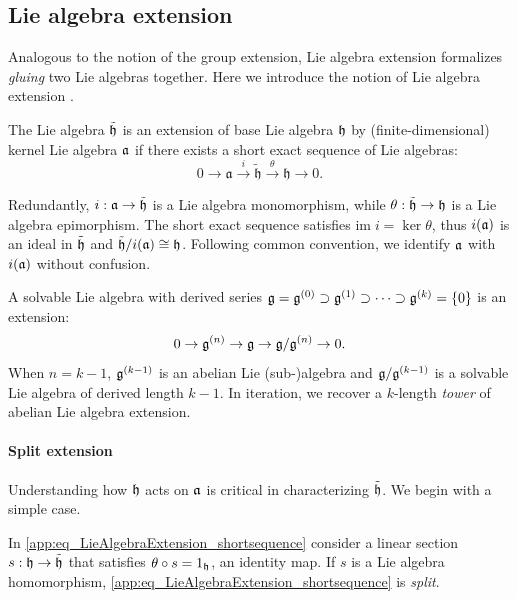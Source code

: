 \subsection{Lie algebra extension}
\label{app:subsubsec_extensionprelim}
Analogous to the notion of the group extension, Lie algebra extension formalizes \emph{gluing} two Lie algebras together.
Here we introduce the notion of Lie algebra extension \cite{weibel1994introduction,rotman2009introduction, PhysicsExtension, beckett2022symplectic}.
\begin{definition}
    \label{app:def_LieAlgebraExtension}
    The Lie algebra $\tilde{\mathfrak{h}}$ is an extension of base Lie algebra $\mathfrak{h}$ by (finite-dimensional) kernel Lie algebra $\mathfrak{a}$ if there exists a short exact sequence of Lie algebras:
    \begin{equation}
    \label{app:eq_LieAlgebraExtension_shortsequence}
        0 \to \mathfrak{a} \xrightarrow{i} \tilde{\mathfrak{h}} \xrightarrow{\theta} \mathfrak{h} \to 0.
    \end{equation}
\end{definition}
Redundantly, $i: \mathfrak{a} \to \tilde{\mathfrak{h}}$ is a Lie algebra monomorphism,
while $\theta: \tilde{\mathfrak{h}} \to \mathfrak{h}$ is a Lie algebra epimorphism.
The short exact sequence satisfies $\text{im}\; i = \ker \theta$,
thus $i(\mathfrak{a})$ is an ideal in $\tilde{\mathfrak{h}}$ and $\tilde{\mathfrak{h}}/i(\mathfrak{a}) \cong \mathfrak{h}$.
Following common convention, we identify $\mathfrak{a}$ with $i(\mathfrak{a})$ without confusion.
\begin{remark}
\label{app:rem_solvable_k_tower}
A solvable Lie algebra with derived series $\mathfrak{g} = \mathfrak{g}^{(0)} \supset \mathfrak{g}^{(1)} \supset \cdots \supset \mathfrak{g}^{(k)}=\{0\}$
is an extension:
\begin{equation*}
    0 \to \mathfrak{g}^{(n)} \to \mathfrak{g} \to \mathfrak{g} / \mathfrak{g}^{(n)} \to 0.
\end{equation*}
When $n = k-1$, $\mathfrak{g}^{(k-1)}$ is an abelian Lie (sub-)algebra and
$\mathfrak{g} / \mathfrak{g}^{(k-1)}$ is a solvable Lie algebra of derived length $k-1$.
In iteration, we recover a $k$-length \emph{tower} of abelian Lie algebra extension.
\paragraph{Split extension}
Understanding how $\mathfrak{h}$ acts on $\mathfrak{a}$ is critical in characterizing $\tilde{\mathfrak{h}}$.
We begin with a simple case.
\end{remark}
\begin{definition}
    In \cref{app:eq_LieAlgebraExtension_shortsequence}
    consider a linear section $s: \mathfrak{h} \to \tilde{\mathfrak{h}}$ that satisfies $\theta \circ s = 1_{\mathfrak{h}}$, an identity map.
    If $s$ is a Lie algebra homomorphism, \cref{app:eq_LieAlgebraExtension_shortsequence} is \emph{split}.
\end{definition}

